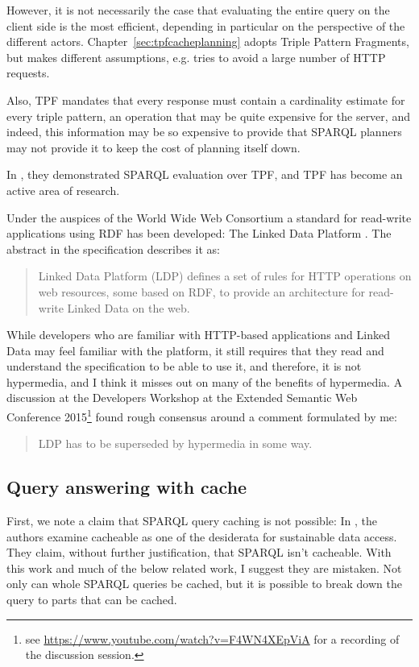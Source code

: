 However, it is not necessarily the case that evaluating the entire
query on the client side is the most efficient, depending in
particular on the perspective of the different
actors. Chapter~\ref{sec:tpfcacheplanning} adopts Triple Pattern
Fragments, but makes different assumptions, e.g. tries to avoid a
large number of HTTP requests. 

Also, TPF mandates that every response must contain a cardinality
estimate for every triple pattern, an operation that may be quite
expensive for the server, and
indeed, this information may be so expensive to provide that SPARQL
planners may not provide it to keep the cost of planning itself
down. 

In \cite{verborgh2014querying}, they demonstrated SPARQL evaluation
over TPF, and TPF has become an active area of research.

Under the auspices of the  World Wide Web Consortium a standard for
read-write applications using RDF has been developed: The Linked Data
Platform \cite{ldp1}. The abstract in the specification describes it
as:
\begin{quote}
Linked Data Platform (LDP) defines a set of rules for HTTP operations
on web resources, some based on RDF, to provide an architecture for
read-write Linked Data on the web.
\end{quote}
While developers who are familiar with HTTP-based applications and
Linked Data may feel familiar with the platform, it still requires
that they read and understand the specification to be able to use it,
and therefore, it is not hypermedia, and I think it misses out on many
of the benefits of hypermedia. A discussion at the Developers Workshop
at the Extended Semantic Web Conference 2015\footnote{see
  \url{https://www.youtube.com/watch?v=F4WN4XEpViA} for a recording of
  the discussion session.} found rough consensus around a comment
formulated by me:
\begin{quote}
LDP has to be superseded by hypermedia in some way.
\end{quote}


\subsection{Query answering with cache}\label{sec:relcache}

First, we note a claim that SPARQL query caching is not possible:
In \cite{hogan2014paths}, the authors examine cacheable as one of the
desiderata for sustainable data access. They claim, without further
justification, that SPARQL isn't cacheable. With this work and much of
the below related work, I suggest they are mistaken. Not only can
whole SPARQL queries be cached, but it is possible to break down the
query to parts that can be cached.

